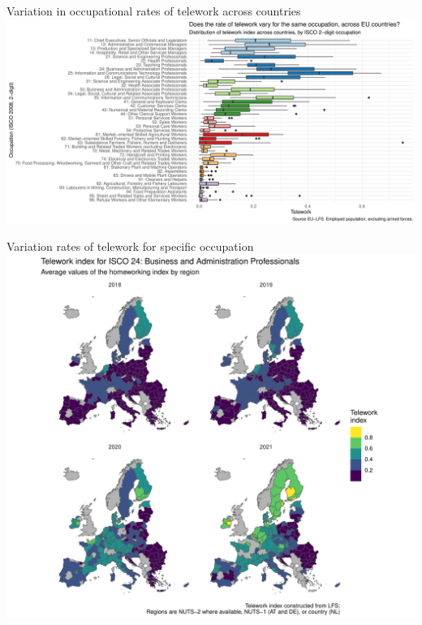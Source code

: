 \documentclass[10pt,handout]{beamer}
\begin{document}
\begin{frame}{Variation in occupational rates of telework across countries}
\pause
\centering
\includegraphics[width=\textwidth,height=0.9\textheight,keepaspectratio]{Variation_telework_occupation_boxplot.pdf}
\end{frame}

\begin{frame}{Variation rates of telework for specific occupation}
\pause
\centering
\includegraphics[width=\textwidth,height=0.9\textheight,keepaspectratio]{telework_isco24_countries.pdf}
\end{frame}
\end{document}
